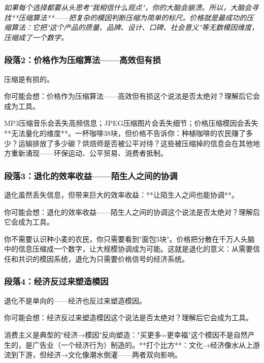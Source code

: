 \documentclass[a4paper,12pt]{book}
\newenvironment{motivation}{\begin{tcolorbox}[colback=gray!10,colframe=gray!60,title=\textit{本章动机},fonttitle=\bfseries,arc=0mm,leftrule=3mm]\small\itshape}{\end{tcolorbox}}
\begin{document}
\begin{motivation}
\begin{motivation}
\begin{motivation}
如果每个选择都要从头思考"我相信什么观点"，你的大脑会崩溃。所以，大脑会寻找**压缩算法**——把复杂的模因判断压缩为简单的标尺。价格就是最成功的压缩算法：它把"这个产品的质量、品牌、设计、口碑、社会意义"等无数模因维度，压缩成了一个数字。

	\subsubsection*{段落2：价格作为压缩算法——高效但有损}
	压缩是有损的。
	\begin{tcolorbox}[colback=yellow!5, title=\textit{读者行为预测}]
		你可能会想：价格作为压缩算法——高效但有损这个说法是否太绝对？理解后它会成为工具。
	\end{tcolorbox}

MP3压缩音乐会丢失高频信息；JPEG压缩图片会丢失细节；价格压缩模因会丢失**无法量化的维度**。一杯咖啡38块，但价格不告诉你：种植咖啡的农民赚了多少？运输排放了多少碳？烘焙师是否被公平对待？这些被压缩掉的信息会在其他地方重新涌现——环保运动、公平贸易、消费者抵制。

	\subsubsection*{段落3：退化的效率收益——陌生人之间的协调}
	退化虽然丢失信息，但带来巨大的效率收益：**让陌生人之间也能协调**。
	\begin{tcolorbox}[colback=yellow!5, title=\textit{读者行为预测}]
		你可能会想：退化的效率收益——陌生人之间的协调这个说法是否太绝对？理解后它会成为工具。
	\end{tcolorbox}

你不需要认识种小麦的农民，你只需要看到"面包5块"。价格把分散在千万人头脑中的信息压缩成一个数字，让大规模协调成为可能。这就是退化的意义：从需要信任和共识的模因系统，退化为只需要价格信号的经济系统。

	\subsubsection*{段落4：经济反过来塑造模因}
	退化不是单向的——经济也反过来塑造模因。
	\begin{tcolorbox}[colback=yellow!5, title=\textit{读者行为预测}]
		你可能会想：经济反过来塑造模因这个说法是否太绝对？理解后它会成为工具。
	\end{tcolorbox}

消费主义是典型的"经济→模因"反向塑造："买更多=更幸福"这个模因不是自然产生的，是广告业（一个经济行为）制造的。**打个比方**：文化→经济像水从上游流到下游，但经济→文化像潮水倒灌——两者双向影响。


\end{motivation}
\end{motivation}
\end{motivation}
\end{document}
